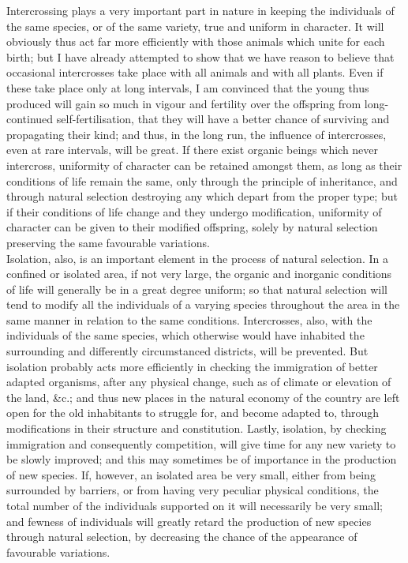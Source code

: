 \indent Intercrossing plays a very important part in nature in keeping the individuals of the same species, or of the same variety, true and uniform in character. It will obviously thus act far more efficiently with those animals which unite for each birth; but I have already attempted to show that we have reason to believe that occasional intercrosses take place with all animals and with all plants. Even if these take place only at long intervals, I am convinced that the young thus produced will gain so much in vigour and fertility over the offspring from long-continued self-fertilisation, that they will have a better chance of surviving and propagating their kind; and thus, in the long run, the influence of intercrosses, even at rare intervals, will be great. If there exist organic beings which never intercross, uniformity of character can be retained amongst them, as long as their conditions of life remain the same, only through the principle of inheritance, and through natural selection destroying any which depart from the proper type; but if their conditions of life change and they undergo modification, uniformity of character can be given to their modified offspring, solely by natural selection preserving the same favourable variations. \\
\indent Isolation, also, is an important element in the process of natural selection. In a confined or isolated area, if not very large, the organic and inorganic conditions of life will generally be in a great degree uniform; so that natural selection will tend to modify all the individuals of a varying species throughout the area in the same manner in relation to the same conditions. Intercrosses, also, with the individuals of the same species, which otherwise would have inhabited the surrounding and differently circumstanced districts, will be prevented.  But isolation probably acts more efficiently in checking the immigration of better adapted organisms, after any physical change, such as of climate or elevation of the land, \&c.; and thus new places in the natural economy of the country are left open for the old inhabitants to struggle for, and become adapted to, through modifications in their structure and constitution.  Lastly, isolation, by checking immigration and consequently competition, will give time for any new variety to be slowly improved; and this may sometimes be of importance in the production of new species.  If, however, an isolated area be very small, either from being surrounded by barriers, or from having very peculiar physical conditions, the total number of the individuals supported on it will necessarily be very small; and fewness of individuals will greatly retard the production of new species through natural selection, by decreasing the chance of the appearance of favourable variations. \\
